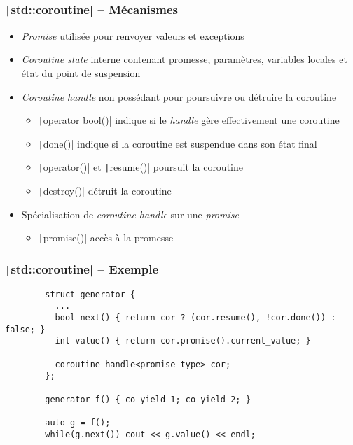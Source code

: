 \documentclass[C++.tex]{subfiles}
\begin{document}
\begin{frame}[fragile]
	\frametitle{\texttt|std::coroutine| -- Mécanismes}
	\begin{itemize}
		\item \textit{Promise} utilisée pour renvoyer valeurs et exceptions
		\item \textit{Coroutine state} interne contenant promesse, paramètres, variables locales et état du point de suspension
		\item \textit{Coroutine handle} non possédant pour poursuivre ou détruire la coroutine
		\begin{itemize}
			\item \texttt|operator bool()| indique si le \textit{handle} gère effectivement une coroutine
			\item \texttt|done()| indique si la coroutine est suspendue dans son état final


			\item \texttt|operator()| et \texttt|resume()| poursuit la coroutine
			\item \texttt|destroy()| détruit la coroutine
		\end{itemize}
		\item Spécialisation de \textit{coroutine handle} sur une \textit{promise}
		\begin{itemize}
			\item \texttt|promise()| accès à la promesse
		\end{itemize}
	\end{itemize}
\end{frame}

\begin{frame}[fragile]
	\frametitle{\texttt|std::coroutine| -- Exemple}
	\begin{verbatim}
		struct generator {
		  ...
		  bool next() { return cor ? (cor.resume(), !cor.done()) : false; }
		  int value() { return cor.promise().current_value; }

		  coroutine_handle<promise_type> cor;
		};

		generator f() { co_yield 1; co_yield 2; }

		auto g = f();
		while(g.next()) cout << g.value() << endl;
	\end{verbatim}
\end{frame}
\end{document}
